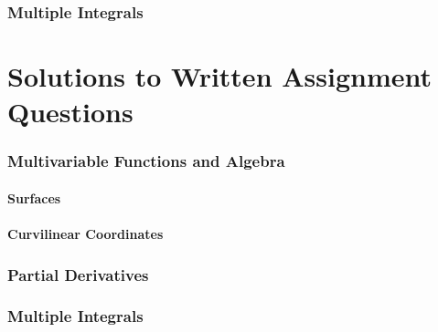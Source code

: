 \documentclass{article}
\begin{document}
\section{Multiple Integrals}
%

\newpage
\part{Solutions to Written Assignment Questions}
\setcounter{section}{1}

\section{Multivariable Functions and Algebra}

\newpage %

\newpage %
\subsection{Surfaces}
\newpage %
\subsection{Curvilinear Coordinates}
\newpage %

\newpage %

\newpage %

\section{Partial Derivatives}

\newpage

\section{Multiple Integrals}
%
\end{document}
